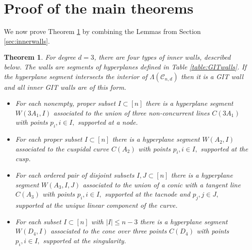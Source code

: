 \documentclass{amsart}
\newcommand{\mc}{\mathcal}
\numberwithin{equation}{section}
\newtheorem{thm}[prop]{Theorem}
\theoremstyle{definition}
\begin{document}
\section{Proof of the main theorems}

We now prove Theorem \ref{thm:GIT_walls} by combining the Lemmas from Section \ref{sec:innerwalls}.

\begin{thm} \label{thm:GIT_walls}
    For degree $d=3$, there are four types of inner walls, described below. The walls are segments of hyperplanes defined in Table \ref{table:GITwalls}. If the hyperplane segment intersects the interior of $\Lambda(\mc{C}_{n,d})$ then it is a GIT wall and all inner GIT walls are of this form.
    \begin{itemize}
        \item[(i)] For each nonempty, proper subset $I \subset [n]$ there is a hyperplane segment $W(3A_1, I)$ associated to the union of three non-concurrent lines $C(3A_1)$ with points $p_i, i \in I, $ supported at a node.  
        \item[(ii)] For each proper subset $I \subset [n]$ there is a hyperplane segment $W(A_2,I)$ associated to the cuspidal curve $C(A_2)$ with points $p_i, i \in I, $ supported at the cusp.
        \item[(iii)]  For each ordered pair of disjoint subsets $I,J \subset [n]$ there is a hyperplane segment $W(A_3, I, J)$ associated to  the union of a conic with a tangent line $C(A_3)$ with points $p_i, i \in I, $ supported at the tacnode and $p_j, j \in J, $ supported at the unique linear component of the curve.
        \item[(iv)] For each subset $I \subset [n]$ with $|I| \leq n-3$ there is a hyperplane segment $W(D_4, I)$ associated to the cone over three points $C(D_4)$ with points $p_i, i \in I, $ supported at the singularity. 
    \end{itemize}
\end{thm}
\end{document}
